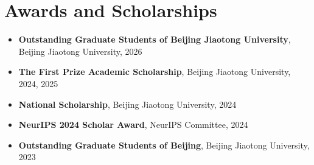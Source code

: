 \documentclass[11pt,a4paper,roman]{moderncv}        %
\begin{document}

    
	\vspace*{-2mm}
	\section{Awards and Scholarships}
	\begin{minipage}{\maincolumnwidth}%
			\begin{itemize}
				\vspace{1mm}
				\item[\textbullet] \textbf{Outstanding Graduate Students of Beijing Jiaotong University}, Beijing Jiaotong University, 2026
				\vspace{1mm}
				\item[\textbullet] \textbf{The First Prize Academic Scholarship}, Beijing Jiaotong University, 2024, 2025
				\vspace{1mm}
				\item[\textbullet] \textbf{National Scholarship}, Beijing Jiaotong University, 2024
				\vspace{1mm}
                \item[\textbullet] \textbf{NeurIPS 2024 Scholar Award}, NeurIPS Committee, 2024
				\vspace{1mm}
				\item[\textbullet] \textbf{Outstanding Graduate Students of Beijing}, Beijing Jiaotong University, 2023
				\vspace{1mm}

\end{itemize}
\end{minipage}
\end{document}

